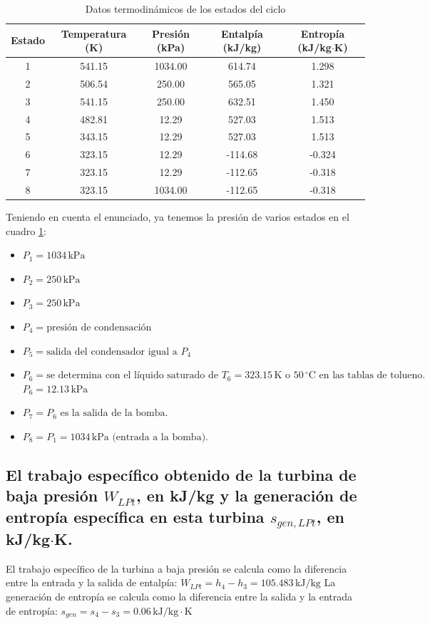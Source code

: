 \documentclass[conference]{IEEEtran}
\theoremstyle{mytheoremstyle}
\theoremstyle{mytheoremstyle}
\theoremstyle{myproblemstyle}
\begin{document}
\begin{table}[htbp] %
    \centering
    \caption{Datos termodinámicos de los estados del ciclo}
    \begin{tabular}{|c|c|c|c|c|}
        \hline
        \textbf{Estado} & \textbf{Temperatura (K)} & \textbf{Presión (kPa)} & \textbf{Entalpía (kJ/kg)} & \textbf{Entropía (kJ/kg$\cdot$K)} \\
        \hline
        1 & 541.15 & 1034.00 & 614.74 & 1.298 \\
        2 & 506.54 & 250.00 & 565.05 & 1.321 \\
        3 & 541.15 & 250.00 & 632.51 & 1.450 \\
        4 & 482.81 & 12.29 & 527.03 & 1.513 \\
        5 & 343.15 & 12.29 & 527.03 & 1.513 \\
        6 & 323.15 & 12.29 & -114.68 & -0.324 \\
        7 & 323.15 & 12.29 & -112.65 & -0.318 \\
        8 & 323.15 & 1034.00 & -112.65 & -0.318 \\
        \hline
    \end{tabular}
    \label{tab:datos_termodinamicos}
\end{table}


Teniendo en cuenta el enunciado, ya tenemos la presión de varios estados en el cuadro \ref{tab:datos_termodinamicos}:
\begin{itemize}
    \item $P_1 = 1034 \, \text{kPa}$ 
    \item $P_2 = 250 \, \text{kPa}$ 
    \item $P_3 = 250 \, \text{kPa}$ 
    \item $P_4 = \text{presión de condensación}$ 
    \item $P_5 = \text{salida del condensador igual a } P_4$ 
    \item $P_6 = \text{se determina con el líquido saturado de } T_6 = 323.15 \, \text{K} \text{ o } 50 \,^{\circ}\text{C} \text{ en las tablas de tolueno.}$ 
    $P_6 = 12.13 \, \text{kPa}$ 
    \item $P_7 = P_6 \text{ es la salida de la bomba.}$ 
    \item $P_8 = P_1 = 1034 \, \text{kPa} \text{ (entrada a la bomba).}$ 
\end{itemize}

\subsection*{El trabajo específico obtenido de la turbina de baja presión $W_{LPt}$, en kJ/kg y la generación de entropía específica en esta turbina $s_{gen,LPt}$, en kJ/kg$\cdot$K.}
El trabajo específico de la turbina a baja presión se calcula como la diferencia entre la entrada y la salida de entalpía:
$W_{LPt} = h_4 - h_3 = 105.483 \, \text{kJ/kg}$ 
La generación de entropía se calcula como la diferencia entre la salida y la entrada de entropía:
$s_{gen} = s_4 - s_3 = 0.06 \, \text{kJ/kg}\cdot\text{K}$ 
\end{document}

